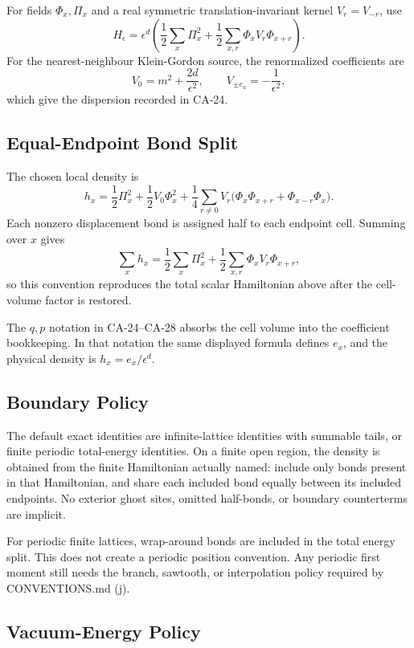 For fields \(\Phi_x,\Pi_x\) and a real symmetric translation-invariant kernel
\(V_r=V_{-r}\), use
\[
  H_\epsilon
  =
  \epsilon^d
  \left(
    \frac12\sum_x\Pi_x^2
    +
    \frac12\sum_{x,r}\Phi_xV_r\Phi_{x+r}
  \right).
\]
For the nearest-neighbour Klein-Gordon source, the renormalized coefficients are
\[
  V_0=m^2+\frac{2d}{\epsilon^2},
  \qquad
  V_{\pm e_a}=-\frac{1}{\epsilon^2},
\]
which give the dispersion recorded in CA-24.

\subsection{Equal-Endpoint Bond Split}

The chosen local density is
\[
  h_x
  =
  \frac12\Pi_x^2
  +
  \frac12 V_0\Phi_x^2
  +
  \frac14\sum_{r\ne0}V_r
  \bigl(\Phi_x\Phi_{x+r}+\Phi_{x-r}\Phi_x\bigr).
\]
Each nonzero displacement bond is assigned half to each endpoint cell.  Summing
over \(x\) gives
\[
  \sum_x h_x
  =
  \frac12\sum_x\Pi_x^2
  +
  \frac12\sum_{x,r}\Phi_xV_r\Phi_{x+r},
\]
so this convention reproduces the total scalar Hamiltonian above after the
cell-volume factor is restored.

The \(q,p\) notation in CA-24--CA-28 absorbs the cell volume into the coefficient
bookkeeping.  In that notation the same displayed formula defines \(e_x\), and
the physical density is \(h_x=e_x/\epsilon^d\).

\subsection{Boundary Policy}

The default exact identities are infinite-lattice identities with summable
tails, or finite periodic total-energy identities.  On a finite open region,
the density is obtained from the finite Hamiltonian actually named: include
only bonds present in that Hamiltonian, and share each included bond equally
between its included endpoints.  No exterior ghost sites, omitted half-bonds,
or boundary counterterms are implicit.

For periodic finite lattices, wrap-around bonds are included in the total
energy split.  This does not create a periodic position convention.  Any
periodic first moment still needs the branch, sawtooth, or interpolation policy
required by CONVENTIONS.md (j).

\subsection{Vacuum-Energy Policy}

